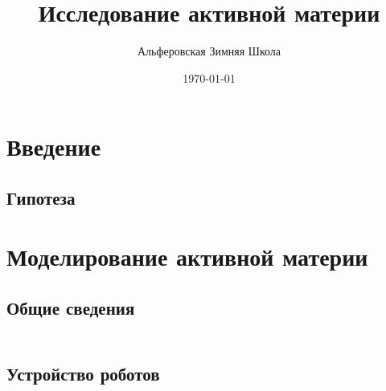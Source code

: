 \documentclass[aspectratio=169]{beamer}
\title{Исследование активной материи}
\author{Альферовская Зимняя Школа}
\date{\today}
\begin{document}
	\frame[plain]{\titlepage}
	
	\section{Введение}
	
	\begin{frame}
		\frametitle{\insertsection}
			
	\end{frame}
	
	\subsection{Гипотеза}
	\begin{frame}
		\frametitle{\insertsubsection}
				
	\end{frame}
	
	
	
	\section{Моделирование активной материи}
	\subsection{Общие сведения}
	
	\begin{frame}
		\frametitle{\insertsection}
		\framesubtitle{\insertsubsection}
		\begin{columns}
			\begin{column}{0.5\textwidth}
				
			\end{column}
			\begin{column}{0.5\textwidth}
				\begin{center}
					
				\end{center}
			\end{column}
		\end{columns}
	\end{frame}

	\subsection{Устройство роботов}
	
\end{document}
